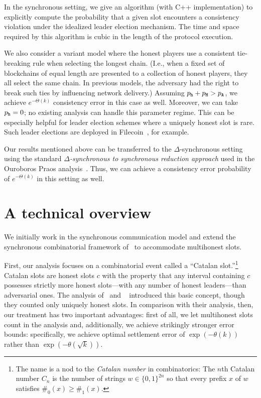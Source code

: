 In the synchronous setting, 
we give an algorithm (with C++ implementation) to explicitly compute the probability 
that a given slot encounters a consistency violation 
under the idealized leader election mechanism. 
The time and space required by this algorithm is cubic 
in the length of the protocol execution.

We also consider a variant model where the honest players use a
consistent tie-breaking rule when selecting the longest chain.  (I.e.,
when a fixed set of blockchains of equal length are presented to a
collection of honest players, they all select the same chain.
In previous models, the adversary had the right to break such ties by influencing
network delivery.)
Assuming $p_{\mathtt{h}} + p_{\mathtt{H}} > p_{\mathtt{A}}$, we achieve 
$e^{-\Theta(k)}$ consistency error in this case as well. 
Moreover, we can take $p_{\mathtt{h}} =0$; 
no existing analysis can handle this parameter regime. 
This can be especially helpful for leader election schemes
where a uniquely honest slot is rare. 
Such leader elections are deployed in Filecoin~\cite{Filecoin}, for example.


Our results mentioned above can be transferred to
the $\Delta$-synchronous setting using the standard 
\emph{$\Delta$-synchronous to synchronous reduction
approach} used in the Ouroboros Praos analysis~\cite{Praos}. Thus, we
can achieve a consistency error probability of $e^{-\Theta(k)}$ in this
setting as well. 




\section{A technical overview}
We initially work in the synchronous communication model and extend
the synchronous combinatorial framework
of~\cite{LinearConsistency} to accommodate multihonest
slots. 

First, our analysis focuses on a combinatorial event called a ``Catalan
slot.''\footnote{The name is a nod to the \emph{Catalan number} in
  combinatorics: The $n$th Catalan number $C_n$ is the number of
  strings $w \in \{0, 1\}^{2n}$ so that every prefix $x$ of $w$
  satisfies $\#_0(x) \geq \#_1(x)$.} Catalan slots are honest slots
$c$ with the property that any interval containing $c$ possesses
strictly more honest slots---with any number of honest leaders---than
adversarial ones. The analysis of~\cite{SnowWhite} and ~\cite{Sleepy}
introduced this basic concept, though they counted only uniquely
honest slots. In comparison with their analysis, then, our treatment
has two important advantages: first of all, we let multihonest
slots count in the analysis and, additionally, we achieve strikingly
stronger error bounds: specifically, we achieve optimal settlement
error of $\exp(-\theta(k))$ rather than $\exp(-\theta(\sqrt{k}))$.

